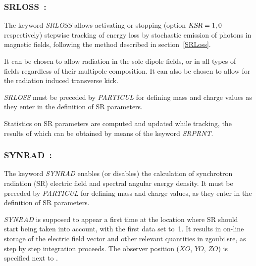 \subsubsection*{SRLOSS~: \SRLOSSTitl\ \cite{FMSEA-00-01} } \label{SRLOSS}
\medskip 
{}

\noindent The keyword \textsl{SRLOSS} allows activating or stopping (option $\textsl{KSR}=1,0$ respectively) 
 stepwise tracking  of energy loss by stochastic emission of 
photons in magnetic fields, following the method described in section~\ref{SRLoss}.  

\bigskip

\noindent  It can be chosen to allow radiation in the sole dipole fields, or in all types of fields regardless of 
their multipole composition.  It can also be chosen to allow for the radiation induced transverse kick. 

\bigskip

\noindent  \textsl{SRLOSS}  must be preceded by \textsl{PARTICUL} for defining  mass and charge 
values as they enter in the definition of SR parameters. 


\bigskip

\noindent  Statistics on SR parameters are  computed and updated while tracking, the results of which can be obtained by means of 
the keyword  \textsl{SRPRNT}. 


\newpage

\subsubsection*{SYNRAD~: \SYNRADTitl}\label{SYNRAD}
\medskip 

\noindent The keyword \textsl{SYNRAD} enables (or disables) the calculation of 
synchrotron radiation (SR) electric field and spectral angular energy density. It must be 
preceded by \textsl{PARTICUL} for defining  mass and charge values, as they enter 
in the definition of SR parameters. 

\bigskip

\noindent\textsl{SYNRAD} is supposed to appear a first time at the 
location where SR should start being taken into account, with the first data \textsl{\KSR} set 
to~1. It results in on-line storage of the electric field vector and 
other relevant quantities in zgoubi.sre, as step by step integration 
proceeds. The observer position ($XO$, $YO$, $ZO$) is specified next 
to \textsl{\KSR}.

